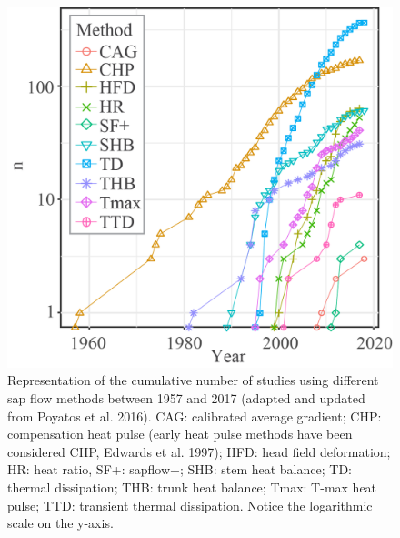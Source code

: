 \documentclass[11pt,twoside]{reedthesis}
\begin{document}
\setlength{\abovecaptionskip}{15pt}
\begin{figure}[hbt!]

{\centering \includegraphics[width=0.8\linewidth]{figure/appendixA/fig1} 

}

\caption[Representation of the cumulative number of studies using different sap flow methods between 1957 and 2017]{Representation of the cumulative number of studies using different sap flow methods between 1957 and 2017 (adapted and updated from Poyatos et al. 2016). CAG: calibrated average gradient; CHP: compensation heat pulse (early heat pulse methods have been considered CHP, Edwards et al. 1997); HFD: head field deformation; HR: heat ratio, SF+: sapflow+; SHB: stem heat balance; TD: thermal dissipation; THB: trunk heat balance; Tmax: T-max heat pulse; TTD: transient thermal dissipation. Notice the logarithmic scale on the y-axis.}\label{fig:apa11}
\end{figure}
\setlength{\abovecaptionskip}{0pt} \newpage
\end{document}
